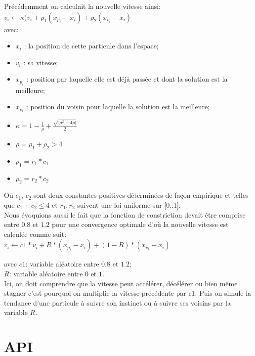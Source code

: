 \documentclass[12pt]{article}
\begin{document}
    Précédemment on calculait la nouvelle vitesse ainsi:\\
    

    $ v_{i} \leftarrow \kappa (v_{i} + \rho_{1} (x_{p_{i}} - x_{i}) + \rho_{2} (x_{v_{i}} - x_{i}) $ \\
    avec: 
    \begin{itemize}
      \item \textit{ $x_{i}$ } : la position de cette particule dans l'espace;
      \item \textit{ $v_{i}$ } : sa vitesse;
      \item  \textit{ $x_{p_{i}}$ } : position par laquelle elle est déjà passée et dont la solution est la meilleure; 
      \item  \textit{ $x_{v_{i}}$ } : position du voisin pour laquelle la solution est la meilleure; 
      \item $ \kappa = 1 - \frac{1}{\rho} + \frac{\sqrt{ |\rho^2 - 4\rho|}}{2} $
      \item $\rho = \rho_{1} + \rho_{2} > 4$
      \item $\rho_{1} = r_{1}*c_{1}$
      \item $\rho_{2} = r_{2}*c_{2}$ 
	\end{itemize}
    
    
    
Où $c_{1}$, $c_{2}$  sont deux constantes positives déterminées de façon empirique et telles que $c_{1} + c_{2} \le 4 $ et $r_{1}, r_{2}$ suivent une loi uniforme sur [0..1]. \\
  Nous évoquions aussi le fait que la fonction de constriction devait être comprise entre $0.8$ et $1.2$ pour une convergence optimale d'où la nouvelle vitesse est calculée comme suit: \\
    
    $ v_{i} \leftarrow c1 * v_{i} + R * (x_{p_{i}} - x_{i}) + (1-R) * (x_{v_{i}} - x_{i}) $
    
    avec $c1$: variable aléatoire entre $0.8$ et $1.2$;\\
    $R$: variable aléatoire entre $0$ et $1$. \\
    
    Ici, on doit comprendre que la vitesse peut accélérer, décélérer ou bien même stagner c'est pourquoi on multiplie la vitesse précédente par c1. Puis on simule la tendance d'une particule à suivre son instinct ou à suivre ses voisins par la variable $R$. 
    

\section{API}
\end{document}
